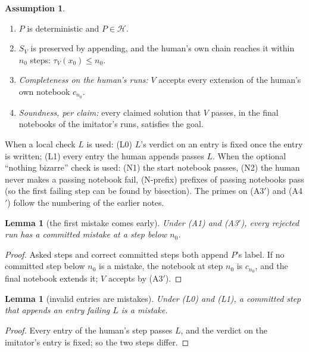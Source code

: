 \documentclass[11pt]{article}
\newtheorem{lemma}[theorem]{Lemma}
\theoremstyle{definition}
\newtheorem{assumption}[theorem]{Assumption}
\theoremstyle{remark}
\newcommand{\Hyp}{\mathcal{H}}
\newcommand{\Sv}{S_{V}}
\newcommand{\tauV}{\tau_{V}}
\begin{document}
\begin{assumption}\label{ass}\
\begin{enumerate}[label=(A\arabic*),nosep]
\item $P$ is deterministic and $P\in\Hyp$.
\item $\Sv$ is preserved by appending, and the human's own chain reaches it within $n_0$ steps: $\tauV(x_0)\le n_0$.
\item[(A3$'$)] \emph{Completeness on the human's runs:} $V$ accepts every extension of the human's own notebook $c_{n_0}$.
\item[(A4$'$)] \emph{Soundness, per claim:} every claimed solution that $V$ passes, in the final notebooks of the imitator's runs, satisfies the goal.
\end{enumerate}
When a local check $L$ is used: (L0) $L$'s verdict on an entry is fixed once the entry is written; (L1) every entry the human appends passes $L$. When the optional ``nothing bizarre'' check is used: (N1) the start notebook passes, (N2) the human never makes a passing notebook fail, (N-prefix) prefixes of passing notebooks pass (so the first failing step can be found by bisection). The primes on (A3$'$) and (A4$'$) follow the numbering of the earlier notes.
\end{assumption}

\begin{lemma}[the first mistake comes early]\label{lem:early}
Under (A1) and (A3$'$), every rejected run has a committed mistake at a step below $n_0$.
\end{lemma}
\begin{proof}
Asked steps and correct committed steps both append $P$'s label. If no committed step below $n_0$ is a mistake, the notebook at step $n_0$ is $c_{n_0}$, and the final notebook extends it; $V$ accepts by (A3$'$).
\end{proof}

\begin{lemma}[invalid entries are mistakes]\label{lem:invalid}
Under (L0) and (L1), a committed step that appends an entry failing $L$ is a mistake.
\end{lemma}
\begin{proof}
Every entry of the human's step passes $L$, and the verdict on the imitator's entry is fixed; so the two steps differ.
\end{proof}
\end{document}
